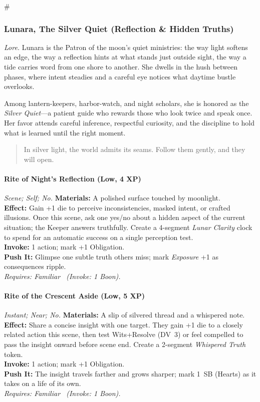 # %

\subsubsection{Lunara, The Silver Quiet (Reflection \& Hidden Truths)}
\textit{Lore.} Lunara is the Patron of the moon's quiet ministries: the way light softens an edge, the way a reflection hints at what stands just outside sight, the way a tide carries word from one shore to another. She dwells in the hush between phases, where intent steadies and a careful eye notices what daytime bustle overlooks.

Among lantern-keepers, harbor-watch, and night scholars, she is honored as the \emph{Silver Quiet}—a patient guide who rewards those who look twice and speak once. Her favor attends careful inference, respectful curiosity, and the discipline to hold what is learned until the right moment.

\begin{quote}
In silver light, the world admits its seams. Follow them gently, and they will open.
\end{quote}

\paragraph*{Rite of Night's Reflection (Low, 4 XP)} \emph{Scene; Self; No.}
\textbf{Materials:} A polished surface touched by moonlight.\\
\textbf{Effect:} Gain +1 die to perceive inconsistencies, masked intent, or crafted illusions. Once this scene, ask one yes/no about a hidden aspect of the current situation; the Keeper answers truthfully. Create a 4-segment \emph{Lunar Clarity} clock to spend for an automatic success on a single perception test.\\
\textbf{Invoke:} 1 action; mark +1 Obligation.\\
\textbf{Push It:} Glimpse one subtle truth others miss; mark \emph{Exposure} +1 as consequences ripple.\\
\emph{Requires: Familiar \ (\textit{Invoke:} 1 Boon).}

\paragraph*{Rite of the Crescent Aside (Low, 5 XP)} \emph{Instant; Near; No.}
\textbf{Materials:} A slip of silvered thread and a whispered note.\\
\textbf{Effect:} Share a concise insight with one target. They gain +1 die to a closely related action this scene, then test Wits+Resolve (DV~3) or feel compelled to pass the insight onward before scene end. Create a 2-segment \emph{Whispered Truth} token.\\
\textbf{Invoke:} 1 action; mark +1 Obligation.\\
\textbf{Push It:} The insight travels farther and grows sharper; mark 1~SB (Hearts) as it takes on a life of its own.\\
\emph{Requires: Familiar \ (\textit{Invoke:} 1 Boon).}

